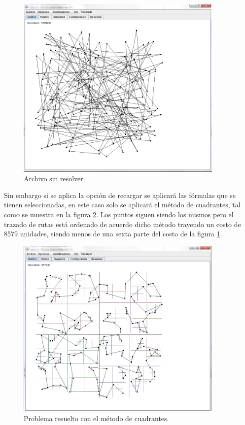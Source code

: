     \begin{figure}[hbtp]
        \centering
            \includegraphics[width=0.9\textwidth]{Software/Imagenes/Software_Uso_3.png}
            \caption{Archivo sin resolver.}
            \label{fig:Software_Uso_3}
    \end{figure}

\clearpage \newpage

\hspace*{1cm}Sin embargo si se aplica la opción de recargar se aplicará las fórmulas que se tienen seleccionadas, en este caso solo se aplicará el método de cuadrantes, tal como se muestra en la figura \ref {fig:Software_Uso_4}. Los puntos siguen siendo los mismos pero el trazado de rutas está ordenado de acuerdo dicho método trayendo un costo de 8579 unidades, siendo menos de una sexta parte del costo de la figura \ref {fig:Software_Uso_3}.\\

    \begin{figure}[hbtp]
        \centering
            \includegraphics[width=0.9\textwidth]{Software/Imagenes/Software_Uso_4.png}
            \caption{Problema resuelto con el método de cuadrantes.}
            \label{fig:Software_Uso_4}
    \end{figure}
\clearpage \newpage

